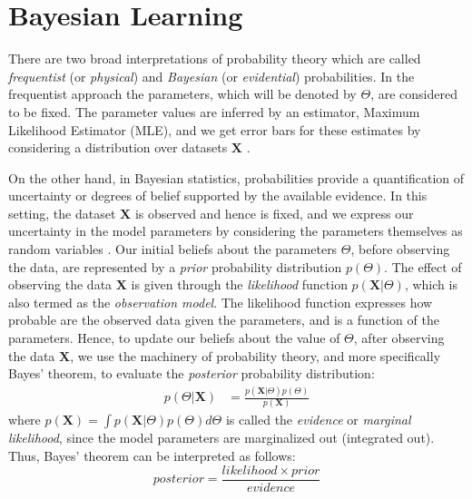 \section{Bayesian Learning} \label{bayesian-learning-section}
There are two broad interpretations of probability theory which are called \emph{frequentist} (or \emph{physical}) and \emph{Bayesian} (or \emph{evidential}) probabilities. In the frequentist approach the parameters, which will be denoted by $\Theta$, are considered to be fixed. The parameter values are inferred by an estimator, \eg Maximum Likelihood Estimator (MLE), and we get error bars for these estimates by considering a distribution over datasets $\mathbf{X}$ \cite[Ch. 1]{Bishop2006}. 

On the other hand, in Bayesian statistics, probabilities provide a quantification of uncertainty or degrees of belief supported by the available evidence. In this setting, the dataset $\mathbf{X}$ is observed and hence is fixed, and we express our uncertainty in the model parameters by considering the parameters themselves as random variables \cite[Ch. 1]{Bishop2006}. Our initial beliefs about the parameters $\Theta$, before observing the data, are represented by a \emph{prior} probability distribution $p(\Theta)$. The effect of observing the data $\mathbf{X}$ is given through the \emph{likelihood} function $p(\mathbf{X}|\Theta)$, which is also termed as the \emph{observation model}. The likelihood function expresses how probable are the observed data given the parameters, and is a function of the parameters. Hence, to update our beliefs about the value of $\Theta$, after observing the data $\mathbf{X}$, we use the machinery of probability theory, and more specifically Bayes' theorem, to evaluate the \emph{posterior} probability distribution:
\begin{equation}
  \begin{aligned}
	p(\Theta | \mathbf{X}) & = \frac{p(\mathbf{X}|\Theta) p(\Theta)}{p(\mathbf{X})} %
  \end{aligned}
\end{equation}
where $p(\mathbf{X}) = \int p(\mathbf{X}|\Theta) p(\Theta) d\Theta$ is called the \emph{evidence} or \emph{marginal likelihood}, since the model parameters are marginalized out (\ie integrated out). Thus, Bayes' theorem can be interpreted as follows:
\begin{equation}
	posterior = \frac{likelihood \times prior}{evidence}
\end{equation}

